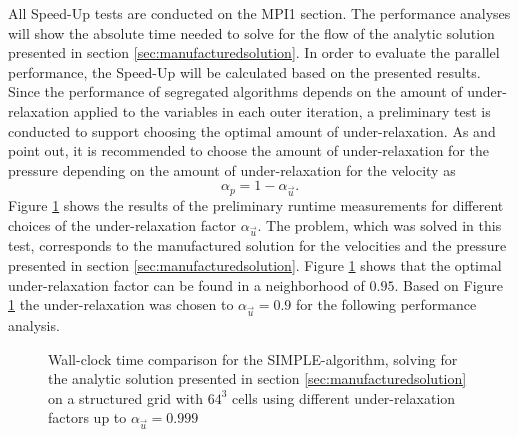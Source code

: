 All Speed-Up tests are conducted on the MPI1 section. The performance analyses will show the absolute time needed to solve for the flow of the analytic solution presented in section \ref{sec:manufacturedsolution}. In order to evaluate the parallel performance, the Speed-Up will be calculated based on the presented results. Since the performance of segregated algorithms depends on the amount of under-relaxation applied to the variables in each outer iteration, a preliminary test is conducted to support choosing the optimal amount of under-relaxation. As \cite{ferziger02} and \cite{schaefer99} point out, it is recommended to choose the amount of under-relaxation for the pressure depending on the amount of under-relaxation for the velocity as
\begin{displaymath}
  \alpha_p = 1 - \alpha_{\vec{u}}.
\end{displaymath}
Figure \ref{fig:underrelax} shows the results of the preliminary runtime measurements for different choices of the under-relaxation factor \( \alpha_{\vec{u}} \). The problem, which was solved in this test, corresponds to the manufactured solution for the velocities and the pressure presented in section \ref{sec:manufacturedsolution}. Figure \ref{fig:underrelax} shows that the optimal under-relaxation factor can be found in a neighborhood of \(0.95\). Based on Figure \ref{fig:underrelax} the under-relaxation was chosen to \( \alpha_{\vec{u}} =0.9 \) for the following performance analysis. 

\begin{figure}[h!]
  \centering
  \caption{Wall-clock time comparison for the SIMPLE-algorithm, solving for the analytic solution presented in section \ref{sec:manufacturedsolution} on a structured grid with $64^3$ cells using different under-relaxation factors up to $\alpha_\vec{u}=0.999$}
  \label{fig:underrelax}
\end{figure}

